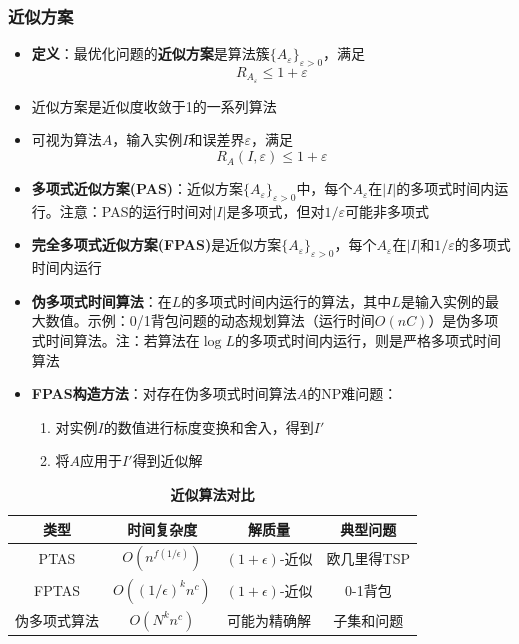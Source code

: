 \documentclass[./../main.tex]{subfiles} %
\begin{document}
\subsubsection{近似方案}
\begin{itemize}
    \item \textbf{定义}：最优化问题的\textbf{近似方案}是算法簇$\{A_\varepsilon\}_{\varepsilon>0}$，满足
    $$
    R_{A_\varepsilon} \leq 1 + \varepsilon
    $$
    
    \item 近似方案是近似度收敛于1的一系列算法
    
    \item 可视为算法$A$，输入实例$I$和误差界$\varepsilon$，满足
    $$
    R_A(I,\varepsilon) \leq 1 + \varepsilon
    $$
    
    \item \textbf{多项式近似方案(PAS)}：近似方案$\{A_\varepsilon\}_{\varepsilon>0}$中，每个$A_\varepsilon$在$|I|$的多项式时间内运行。注意：PAS的运行时间对$|I|$是多项式，但对$1/\varepsilon$可能非多项式
    \item \textbf{完全多项式近似方案(FPAS)}是近似方案$\{A_\varepsilon\}_{\varepsilon>0}$，每个$A_\varepsilon$在$|I|$和$1/\varepsilon$的多项式时间内运行
    
    \item \textbf{伪多项式时间算法}：在$L$的多项式时间内运行的算法，其中$L$是输入实例的最大数值。示例：0/1背包问题的动态规划算法（运行时间$O(nC)$）是伪多项式时间算法。注：若算法在$\log L$的多项式时间内运行，则是严格多项式时间算法
    
    \item \textbf{FPAS构造方法}：对存在伪多项式时间算法$A$的NP难问题：
    \begin{enumerate}
        \item 对实例$I$的数值进行标度变换和舍入，得到$I'$
        \item 将$A$应用于$I'$得到近似解
    \end{enumerate}
\end{itemize}


\begin{table}[h]
\caption{\textbf{近似算法对比}}
\centering
\begin{tabular}{cccc}  %
\toprule  %
\textbf{类型} & \textbf{时间复杂度} & \textbf{解质量} & \textbf{典型问题} \\
\midrule
PTAS & $O(n^{f(1/\epsilon)})$ & $(1+\epsilon)$-近似 & 欧几里得TSP \\

FPTAS & $O((1/\epsilon)^{k}n^{c})$ & $(1+\epsilon)$-近似 & 0-1背包 \\

伪多项式算法 & $O(N^{k}n^{c})$ & 可能为精确解 & 子集和问题 \\
\bottomrule  %
\end{tabular}
\end{table}
\end{document}
